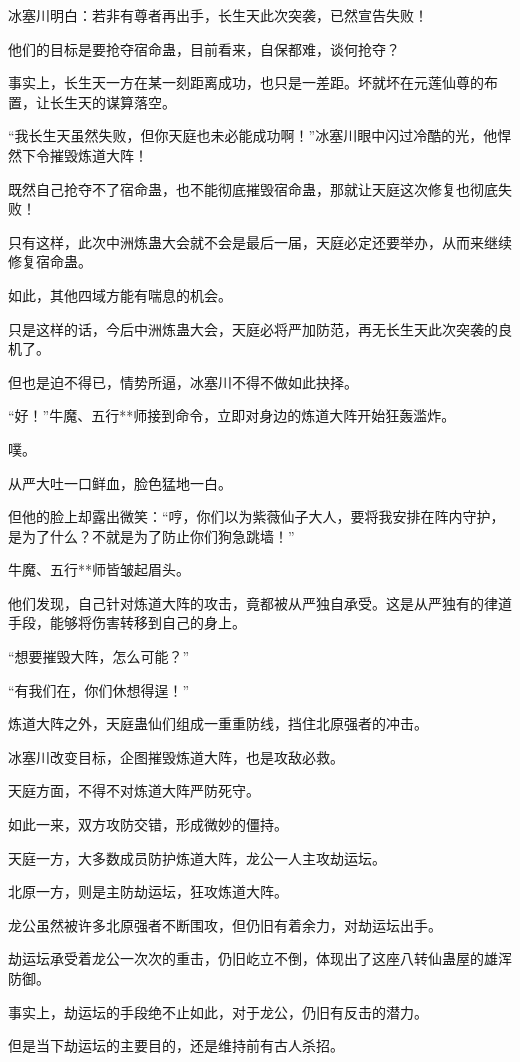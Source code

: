 \begin{this_body}
冰塞川明白：若非有尊者再出手，长生天此次突袭，已然宣告失败！

他们的目标是要抢夺宿命蛊，目前看来，自保都难，谈何抢夺？

事实上，长生天一方在某一刻距离成功，也只是一差距。坏就坏在元莲仙尊的布置，让长生天的谋算落空。

“我长生天虽然失败，但你天庭也未必能成功啊！”冰塞川眼中闪过冷酷的光，他悍然下令摧毁炼道大阵！

既然自己抢夺不了宿命蛊，也不能彻底摧毁宿命蛊，那就让天庭这次修复也彻底失败！

只有这样，此次中洲炼蛊大会就不会是最后一届，天庭必定还要举办，从而来继续修复宿命蛊。

如此，其他四域方能有喘息的机会。

只是这样的话，今后中洲炼蛊大会，天庭必将严加防范，再无长生天此次突袭的良机了。

但也是迫不得已，情势所逼，冰塞川不得不做如此抉择。

“好！”牛魔、五行**师接到命令，立即对身边的炼道大阵开始狂轰滥炸。

噗。

从严大吐一口鲜血，脸色猛地一白。

但他的脸上却露出微笑：“哼，你们以为紫薇仙子大人，要将我安排在阵内守护，是为了什么？不就是为了防止你们狗急跳墙！”

牛魔、五行**师皆皱起眉头。

他们发现，自己针对炼道大阵的攻击，竟都被从严独自承受。这是从严独有的律道手段，能够将伤害转移到自己的身上。

“想要摧毁大阵，怎么可能？”

“有我们在，你们休想得逞！”

炼道大阵之外，天庭蛊仙们组成一重重防线，挡住北原强者的冲击。

冰塞川改变目标，企图摧毁炼道大阵，也是攻敌必救。

天庭方面，不得不对炼道大阵严防死守。

如此一来，双方攻防交错，形成微妙的僵持。

天庭一方，大多数成员防护炼道大阵，龙公一人主攻劫运坛。

北原一方，则是主防劫运坛，狂攻炼道大阵。

龙公虽然被许多北原强者不断围攻，但仍旧有着余力，对劫运坛出手。

劫运坛承受着龙公一次次的重击，仍旧屹立不倒，体现出了这座八转仙蛊屋的雄浑防御。

事实上，劫运坛的手段绝不止如此，对于龙公，仍旧有反击的潜力。

但是当下劫运坛的主要目的，还是维持前有古人杀招。


\end{this_body}
